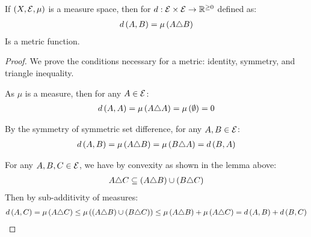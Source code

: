 \begin{theorem}
  If \(\left(X, \mathcal{E}, \mu\right)\) is a measure space,
  then for \(d : \mathcal{E} \times \mathcal{E} \to \mathbb{R}^{\geq 0}\) defined as:
  \begin{align*}
    d\left(A, B\right) = \mu\left(A \triangle B\right)
  \end{align*}
  Is a metric function.
\end{theorem}
\begin{proof}
  We prove the conditions necessary for a metric:
  identity, symmetry, and triangle inequality.

      As \(\mu\) is a measure, then for any \(A \in \mathcal{E}\):
      \begin{align*}
        d\left(A, A\right)
          = \mu\left(A \triangle A\right)
          = \mu\left(\emptyset\right) = 0
      \end{align*}

      By the symmetry of symmetric set difference,
      for any \(A, B \in \mathcal{E}\):
      \begin{align*}
        d\left(A, B\right)
          = \mu\left(A \triangle B\right)
          = \mu\left(B \triangle A\right)
          = d\left(B, A\right)
      \end{align*}

      For any \(A, B, C \in \mathcal{E}\),
      we have by convexity as shown in the lemma above:
      \begin{align*}
        A \triangle C \subseteq
          \left(A \triangle B\right) \cup \left(B \triangle C\right)
      \end{align*}
      Then by sub-additivity of measures:
      \begin{align*}
        d\left(A, C\right)
          = \mu\left(A \triangle C\right)
          \leq \mu\left(
                \left(A \triangle B\right) \cup \left(B \triangle C\right)\right)
          \leq
          \mu\left(A \triangle B\right) + \mu\left(A \triangle C\right)
          = d\left(A, B\right) + d\left(B, C\right)
      \end{align*}
\end{proof}




